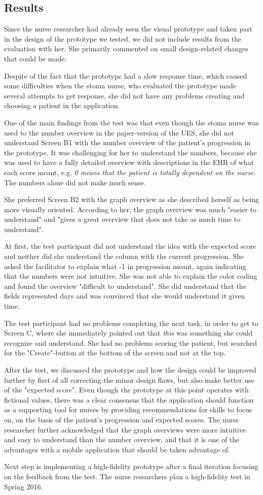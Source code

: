\subsection{Results}
Since the nurse researcher had already seen the visual prototype and taken part in the design of the prototype we tested, we did not include results from the evaluation with her. She primarily commented on small design-related changes that could be made. 

Despite of the fact that the prototype had a slow response time, which caused some difficulties when the stoma nurse, who evaluated the prototype made several attempts to get response, she did not have any problems creating and choosing a patient in the application. 

One of the main findings from the test was that even though the stoma nurse was used to the number overview in the paper-version of the UES, she did not understand Screen B1 with the number overview of the patient's progression in the prototype. It was challenging for her to understand the numbers, because she was used to have a fully detailed overview with descriptions in the EHR of what each score meant, e.g. \textit{0 means that the patient is totally dependent on the nurse}. The numbers alone did not make much sense. 

She preferred Screen B2 with the graph overview as she described herself as being more visually oriented. According to her, the graph overview was much "easier to understand" and "gives a great overview that does not take as much time to understand".

At first, the test participant did not understand the idea with the expected score and neither did she understand the column with the current progression. She asked the facilitator to explain what -1 in progression meant, again indicating that the numbers were not intuitive. She was not able to explain the color coding and found the overview "difficult to understand". She did understand that the fields represented days and was convinced that she would understand it given time. 

The test participant had no problems completing the next task, in order to get to Screen C, where she immediately pointed out that \textit{this} was something she could recognize and understand. She had no problems scoring the patient, but searched for the "Create"-button at the bottom of the screen and not at the top. 

After the test, we discussed the prototype and how the design could be improved further by first of all correcting the minor design flaws, but also make better use of the "expected score". Even though the prototype at this point operates with fictional values, there was a clear consensus that the application should function as a supporting tool for nurses by providing recommendations for skills to focus on, on the basis of the patient's progression and expected scores. The nurse researcher further acknowledged that the graph overviews were more intuitive and easy to understand than the number overview, and that it is one of the advantages with a mobile application that should be taken advantage of.  

Next step is implementing a high-fidelity prototype after a final iteration focusing on the feedback from the test. The nurse researchers plan a high-fidelity test in Spring 2016. 